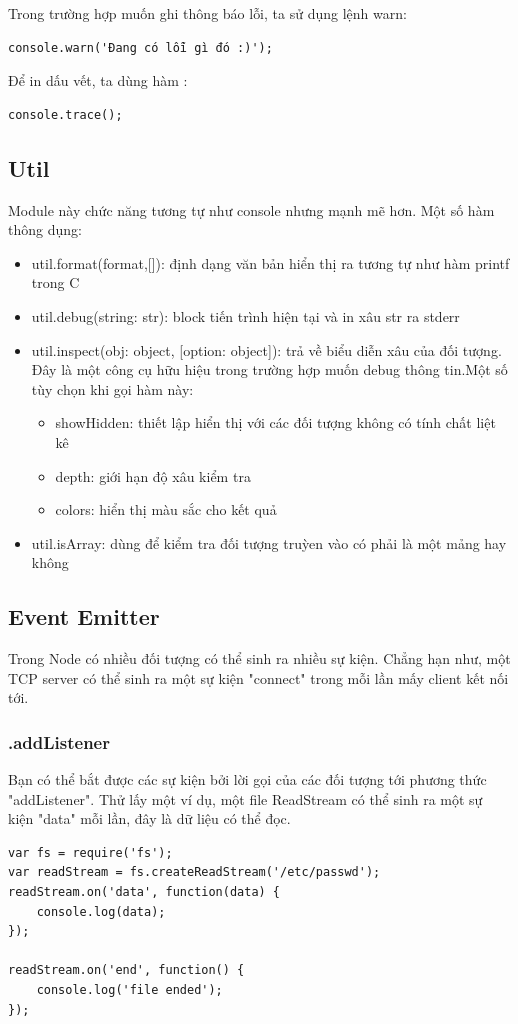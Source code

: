 	Trong trường hợp muốn ghi thông báo lỗi, ta sử dụng lệnh warn:\\
	\begin{verbatim}
console.warn('Đang có lỗi gì đó :)');
	\end{verbatim}

	Để in dấu vết, ta dùng hàm :
	\begin{verbatim}
console.trace();
	\end{verbatim}
	\subsection{Util}
		Module này chức năng tương tự như console nhưng mạnh mẽ hơn. Một số hàm thông dụng:
		\begin{itemize}
			\item util.format(format,[]): định dạng văn bản hiển thị ra tương tự như hàm printf trong C
			\item util.debug(string: str): block tiến trình hiện tại và in xâu str ra stderr
			\item util.inspect(obj: object, [option: object]): 	 trả về biểu diễn xâu của đối tượng. Đây là một công cụ hữu hiệu trong trường hợp muốn debug thông tin.Một số tùy chọn khi gọi hàm này:
			
			\begin{itemize}
				\item showHidden: thiết lập hiển thị với các đối tượng không có tính chất liệt kê
				\item depth: giới hạn độ xâu kiểm tra
				\item colors: hiển thị màu sắc cho kết quả
			\end{itemize}
			
			\item util.isArray:  dùng để kiểm tra đối tượng truỳen vào có phải là một mảng hay không		
		\end{itemize}

	\subsection{Event Emitter}
	Trong Node có nhiều đối tượng có thể sinh ra nhiều sự kiện. Chẳng hạn như, một TCP server có thể sinh ra  một sự kiện "connect" trong mỗi lần mấy client kết nối tới. 
		\subsubsection{.addListener}
Bạn có thể bắt được các sự kiện bởi lời gọi của các đối tượng tới phương thức "addListener". Thử lấy một ví dụ, một file ReadStream có thể sinh ra một sự kiện "data" mỗi lần, đây là dữ liệu có thể đọc.
			\begin{verbatim}
var fs = require('fs');
var readStream = fs.createReadStream('/etc/passwd');
readStream.on('data', function(data) {
	console.log(data);
});

readStream.on('end', function() {
	console.log('file ended');
});
			\end{verbatim}
			
